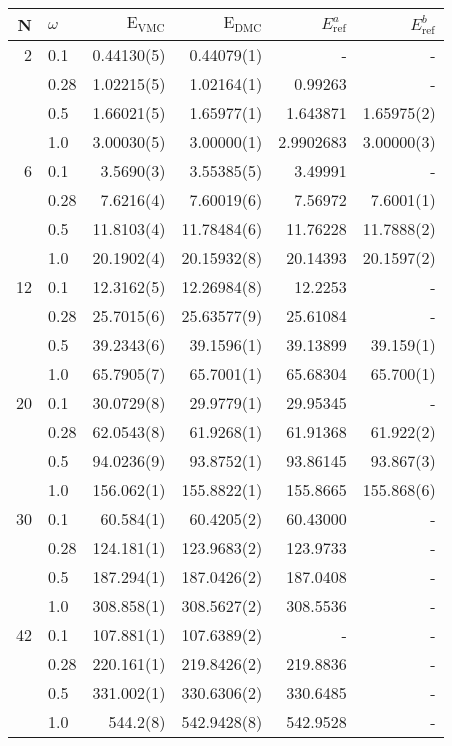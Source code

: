 \clearpage
\begin{table}
\label{tab:QDotsResultsAll}
\begin{center}
\begin{tabular}{rl|rrrr}
    N     & $\omega$ & $\mathrm{E_{VMC}}$ & $\mathrm{E_{DMC}}$ & $E_\mathrm{ref}^a$& $E_\mathrm{ref}^b$\\
\hline\hline
    2     &   0.1    & 0.44130(5)  & 0.44079(1)  &- & -           \\
          &   0.28   & 1.02215(5)  & 1.02164(1)  &0.99263 & -           \\
          &   0.5    & 1.66021(5)  & 1.65977(1)  &1.643871 & 1.65975(2) \\
          &   1.0    & 3.00030(5)  & 3.00000(1)  &2.9902683 & 3.00000(3)  \\
\hline
    6     &   0.1    &  3.5690(3)  &  3.55385(5)  &3.49991 & -          \\
          &   0.28   &  7.6216(4)  &  7.60019(6)  &7.56972 & 7.6001(1)  \\
          &   0.5    & 11.8103(4)  & 11.78484(6)  &11.76228 & 11.7888(2) \\
          &   1.0    & 20.1902(4)  & 20.15932(8)  &20.14393 & 20.1597(2) \\
\hline
    12    &   0.1    & 12.3162(5)  & 12.26984(8) &12.2253 & -           \\
          &   0.28   & 25.7015(6)  & 25.63577(9) &25.61084 & -          \\
          &   0.5    & 39.2343(6)  & 39.1596(1)  &39.13899 & 39.159(1)  \\
          &   1.0    & 65.7905(7)  & 65.7001(1)  &65.68304 & 65.700(1)  \\
\hline
    20    &   0.1    &  30.0729(8)  &  29.9779(1) &29.95345 & -         \\
          &   0.28   &  62.0543(8)  &  61.9268(1) &61.91368 & 61.922(2) \\
          &   0.5    &  94.0236(9)  &  93.8752(1) &93.86145 & 93.867(3) \\
          &   1.0    & 156.062(1)   & 155.8822(1) &155.8665 & 155.868(6) \\
\hline
    30    &   0.1    &  60.584(1)  &  60.4205(2) &60.43000& -  \\
          &   0.28   & 124.181(1)  & 123.9683(2) &123.9733 & -  \\
          &   0.5    & 187.294(1)  & 187.0426(2) &187.0408 & -  \\
          &   1.0    & 308.858(1)  & 308.5627(2) &308.5536 & -  \\
\hline
    42    &   0.1    & 107.881(1)  & 107.6389(2) &- & -  \\
          &   0.28   & 220.161(1)  & 219.8426(2) &219.8836 & -  \\
          &   0.5    & 331.002(1)  & 330.6306(2) &330.6485 & -  \\
          &   1.0    & 544.2(8)    & 542.9428(8) &542.9528 & -  \\
\hline\hline



\end{tabular}
\end{center}
\end{table}
